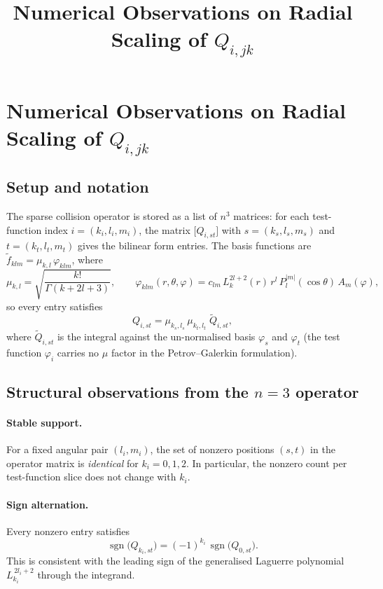 \documentclass{article}
\title{Numerical Observations on Radial Scaling of $Q_{i,jk}$}
\date{}
\begin{document}
\maketitle


\section*{Numerical Observations on Radial Scaling of $Q_{i,jk}$}

\subsection*{Setup and notation}

The sparse collision operator is stored as a list of $n^3$ matrices:
for each test-function index $i = (k_i, l_i, m_i)$, the matrix
$\bigl[Q_{i,st}\bigr]$ with $s = (k_s, l_s, m_s)$ and $t = (k_t, l_t, m_t)$
gives the bilinear form entries.
The basis functions are $\tilde{f}_{klm} = \mu_{k,l}\,\varphi_{klm}$, where
\[
  \mu_{k,l} = \sqrt{\frac{k!}{\Gamma(k+2l+3)}},
  \qquad
  \varphi_{klm}(r,\theta,\varphi)
    = c_{lm}\,L_k^{2l+2}(r)\,r^l\,P_l^{|m|}(\cos\theta)\,A_m(\varphi),
\]
so every entry satisfies
\[
  Q_{i,st} = \mu_{k_s,l_s}\,\mu_{k_t,l_t}\;\tilde{Q}_{i,st},
\]
where $\tilde{Q}_{i,st}$ is the integral against the un-normalised basis
$\varphi_s$ and $\varphi_t$ (the test function $\varphi_i$ carries no $\mu$
factor in the Petrov--Galerkin formulation).

\subsection*{Structural observations from the $n=3$ operator}

\paragraph{Stable support.}
For a fixed angular pair $(l_i,m_i)$, the set of nonzero positions $(s,t)$
in the operator matrix is \emph{identical} for $k_i = 0,1,2$.
In particular, the nonzero count per test-function slice does not change
with $k_i$.

\paragraph{Sign alternation.}
Every nonzero entry satisfies
\[
  \operatorname{sgn}\bigl(Q_{k_i,st}\bigr) = (-1)^{k_i}\,\operatorname{sgn}\bigl(Q_{0,st}\bigr).
\]
This is consistent with the leading sign of the generalised Laguerre
polynomial $L_{k_i}^{\,2l_i+2}$ through the integrand.
\end{document}
